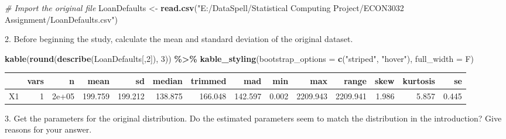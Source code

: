 \documentclass[
]{article}
\newenvironment{Shaded}{\begin{snugshade}}{\end{snugshade}}
\newcommand{\AttributeTok}[1]{\textcolor[rgb]{0.13,0.29,0.53}{#1}}
\newcommand{\CommentTok}[1]{\textcolor[rgb]{0.56,0.35,0.01}{\textit{#1}}}
\newcommand{\DecValTok}[1]{\textcolor[rgb]{0.00,0.00,0.81}{#1}}
\newcommand{\FunctionTok}[1]{\textcolor[rgb]{0.13,0.29,0.53}{\textbf{#1}}}
\newcommand{\NormalTok}[1]{#1}
\newcommand{\OtherTok}[1]{\textcolor[rgb]{0.56,0.35,0.01}{#1}}
\newcommand{\SpecialCharTok}[1]{\textcolor[rgb]{0.81,0.36,0.00}{\textbf{#1}}}
\newcommand{\StringTok}[1]{\textcolor[rgb]{0.31,0.60,0.02}{#1}}
\begin{document}
\begin{Shaded}
\begin{Highlighting}[]
\CommentTok{\# Import the original file}
\NormalTok{LoanDefaults }\OtherTok{\textless{}{-}} \FunctionTok{read.csv}\NormalTok{(}\StringTok{"E:/DataSpell/Statistical Computing Project/ECON3032 Assignment/LoanDefaults.csv"}\NormalTok{)}
\end{Highlighting}
\end{Shaded}

{ 2. Before beginning the study, calculate the mean and standard
deviation of the original dataset.}

\begin{Shaded}
\begin{Highlighting}[]
\FunctionTok{kable}\NormalTok{(}\FunctionTok{round}\NormalTok{(}\FunctionTok{describe}\NormalTok{(LoanDefaults[,}\DecValTok{2}\NormalTok{]), }\DecValTok{3}\NormalTok{)) }\SpecialCharTok{\%\textgreater{}\%}
  \FunctionTok{kable\_styling}\NormalTok{(}\AttributeTok{bootstrap\_options =} \FunctionTok{c}\NormalTok{(}\StringTok{"striped"}\NormalTok{, }\StringTok{"hover"}\NormalTok{), }\AttributeTok{full\_width =}\NormalTok{ F)}
\end{Highlighting}
\end{Shaded}

\begin{table}
\centering
\begin{tabular}{l|r|r|r|r|r|r|r|r|r|r|r|r|r}
\hline
  & vars & n & mean & sd & median & trimmed & mad & min & max & range & skew & kurtosis & se\\
\hline
X1 & 1 & 2e+05 & 199.759 & 199.212 & 138.875 & 166.048 & 142.597 & 0.002 & 2209.943 & 2209.941 & 1.986 & 5.857 & 0.445\\
\hline
\end{tabular}
\end{table}

{ 3. Get the parameters for the original distribution. Do the estimated
parameters seem to match the distribution in the introduction? Give
reasons for your answer. }

\begin{Shaded}
\end{Shaded}
\end{document}
